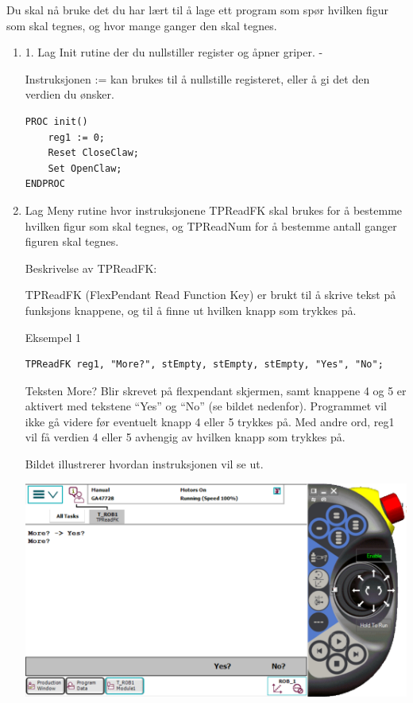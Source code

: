 Du skal nå bruke det du har lært til å lage ett program som spør hvilken
figur som skal tegnes, og hvor mange ganger den skal tegnes.
\begin{enumerate}
\item 1. Lag Init rutine der du nullstiller register og åpner griper. -

Instruksjonen := kan brukes til å nullstille registeret, eller å gi
det den verdien du ønsker.

\begin{lstlisting}[basicstyle={\sffamily}]
PROC init()
	reg1 := 0;
	Reset CloseClaw; 		
	Set OpenClaw;
ENDPROC
\end{lstlisting}

\item Lag Meny rutine hvor instruksjonene TPReadFK skal brukes for å bestemme
hvilken figur som skal tegnes, og TPReadNum for å bestemme antall
ganger figuren skal tegnes.

Beskrivelse av TPReadFK:

TPReadFK (FlexPendant Read Function Key) er brukt til å skrive tekst
på funksjons knappene, og til å finne ut hvilken knapp som trykkes
på.

Eksempel 1

\begin{lstlisting}[basicstyle={\sffamily}]
TPReadFK reg1, "More?", stEmpty, stEmpty, stEmpty, "Yes", "No"; 
\end{lstlisting}

Teksten More? Blir skrevet på flexpendant skjermen, samt knappene
4 og 5 er aktivert med tekstene \textquotedblleft Yes\textquotedblright{}
og \textquotedblleft No\textquotedblright{} (se bildet nedenfor).
Programmet vil ikke gå videre før eventuelt knapp 4 eller 5 trykkes
på. Med andre ord, reg1 vil få verdien 4 eller 5 avhengig av hvilken
knapp som trykkes på. 

Bildet illustrerer hvordan instruksjonen vil se ut.

\includegraphics[width=1\textwidth]{i04861x37}


\end{enumerate}
